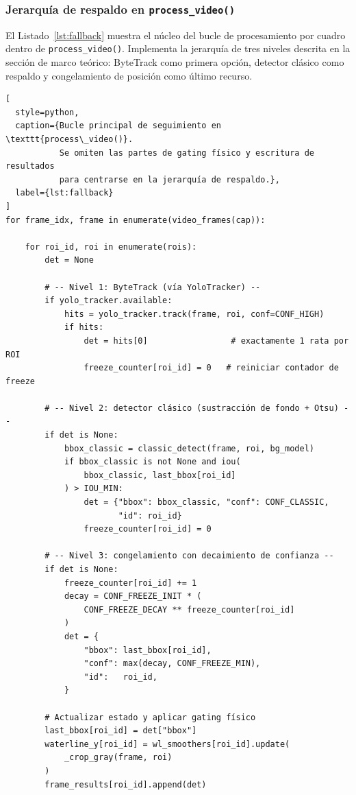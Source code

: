 
\subsubsection{Jerarquía de respaldo en \texttt{process\_video()}}

El Listado~\ref{lst:fallback} muestra el núcleo del bucle de procesamiento
por cuadro dentro de \texttt{process\_video()}. Implementa la jerarquía de
tres niveles descrita en la sección de marco teórico: ByteTrack como
primera opción, detector clásico como respaldo y congelamiento de posición
como último recurso.

\begin{lstlisting}[
  style=python,
  caption={Bucle principal de seguimiento en \texttt{process\_video()}.
           Se omiten las partes de gating físico y escritura de resultados
           para centrarse en la jerarquía de respaldo.},
  label={lst:fallback}
]
for frame_idx, frame in enumerate(video_frames(cap)):

    for roi_id, roi in enumerate(rois):
        det = None

        # -- Nivel 1: ByteTrack (vía YoloTracker) --
        if yolo_tracker.available:
            hits = yolo_tracker.track(frame, roi, conf=CONF_HIGH)
            if hits:
                det = hits[0]                 # exactamente 1 rata por ROI
                freeze_counter[roi_id] = 0   # reiniciar contador de freeze

        # -- Nivel 2: detector clásico (sustracción de fondo + Otsu) --
        if det is None:
            bbox_classic = classic_detect(frame, roi, bg_model)
            if bbox_classic is not None and iou(
                bbox_classic, last_bbox[roi_id]
            ) > IOU_MIN:
                det = {"bbox": bbox_classic, "conf": CONF_CLASSIC,
                       "id": roi_id}
                freeze_counter[roi_id] = 0

        # -- Nivel 3: congelamiento con decaimiento de confianza --
        if det is None:
            freeze_counter[roi_id] += 1
            decay = CONF_FREEZE_INIT * (
                CONF_FREEZE_DECAY ** freeze_counter[roi_id]
            )
            det = {
                "bbox": last_bbox[roi_id],
                "conf": max(decay, CONF_FREEZE_MIN),
                "id":   roi_id,
            }

        # Actualizar estado y aplicar gating físico
        last_bbox[roi_id] = det["bbox"]
        waterline_y[roi_id] = wl_smoothers[roi_id].update(
            _crop_gray(frame, roi)
        )
        frame_results[roi_id].append(det)
\end{lstlisting}

